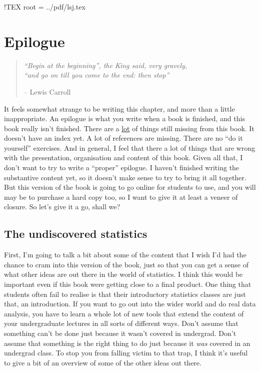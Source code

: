  !TEX root = ../pdf/lsj.tex

\chapter{Epilogue}

\begin{quote}
{\it ``Begin at the beginning'', the King said, very gravely, \\``and go on till you come to the end: then stop''} 

\hspace*{2cm} -- Lewis Carroll
\end{quote}


It feels somewhat strange to be writing this chapter, and more than a little inappropriate. An epilogue is what you write when a book is finished, and this book really isn't finished. There are a \underline{lot} of things still missing from this book. It doesn't have an index yet. A lot of references are missing. There are no ``do it yourself'' exercises. And in general, I feel that there a lot of things that are wrong with the presentation, organisation and content of this book. Given all that, I don't want to try to write a ``proper'' epilogue. I haven't finished writing the substantive content yet, so it doesn't make sense to try to bring it all together. But this version of the book is going to go online for students to use, and you will may be to purchase a hard copy too, so I want to give it at least a veneer of closure. So let's give it a go, shall we?


\newcommand{\ITEM}[1]{\item {\bf #1.}}

\section{The undiscovered statistics}

First, I'm going to talk a bit about some of the content that I wish I'd had the chance to cram into this version of the book, just so that you can get a sense of what other ideas are out there in the world of statistics. I think this would be important even if this book were getting close to a final product. One thing that students often fail to realise is that their introductory statistics classes are just that, an introduction. If you want to go out into the wider world and do real data analysis, you have to learn a whole lot of new tools that extend the content of your undergraduate lectures in all sorts of different ways. Don't assume that something can't be done just because it wasn't covered in undergrad. Don't assume that something is the right thing to do just because it {\it was} covered in an undergrad class. To stop you from falling victim to that trap, I think it's useful to give a bit of an overview of some of the other ideas out there. 

